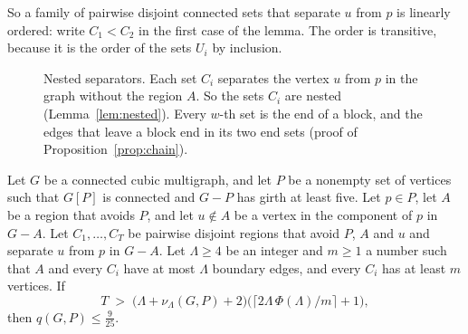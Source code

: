 So a family of pairwise disjoint connected sets that separate $u$ from $p$ is linearly ordered:
write $C_1<C_2$ in the first case of the lemma. The order is transitive, because it is the order
of the sets $U_i$ by inclusion.

\begin{figure}[ht]
\centering
{}
\caption{Nested separators. Each set $C_i$ separates the vertex $u$ from $p$ in the graph
without the region $A$. So the sets $C_i$ are nested (Lemma~\ref{lem:nested}). Every $w$-th set is the end of a block, and the edges that leave a
block end in its two end sets (proof of Proposition~\ref{prop:chain}).}
\label{fig:chain}
\end{figure}

\begin{proposition}\label{prop:chain}
Let $G$ be a connected cubic multigraph, and let $P$ be a nonempty set of vertices such that
$G[P]$ is connected and $G-P$ has girth at least five. Let $p\in P$, let $A$ be a region that
avoids $P$, and let $u\notin A$ be a vertex in the component of $p$ in $G-A$. Let $C_1,\dots,C_T$
be pairwise disjoint regions that avoid $P$, $A$ and $u$ and separate $u$ from $p$ in $G-A$. Let
$\Lambda\ge4$ be an integer and $m\ge1$ a number such that $A$ and every $C_i$ have at most
$\Lambda$ boundary edges, and every $C_i$ has at least $m$ vertices. If
\[
  T\;>\;\bigl(\Lambda+\nu_\Lambda(G,P)+2\bigr)\bigl(\lceil2\Lambda\,\Phi(\Lambda)/m\rceil+1\bigr),
\]
then $q(G,P)\le\frac9{25}$.
\end{proposition}

